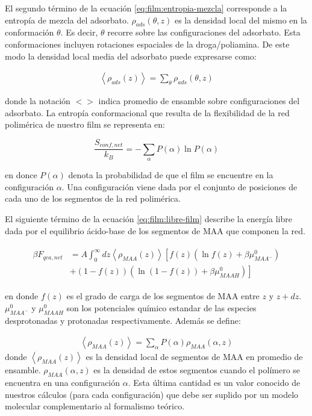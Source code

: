 El segundo t\'ermino de la ecuaci\'on \ref{eq:film:entropia-mezcla} corresponde a la entrop\'ia de mezcla del adsorbato. $\rho_{ads}(\theta,z)$ es la densidad local del mismo en la conformaci\'on $\theta$. Es decir, $\theta$ recorre sobre las configuraciones del adsorbato.
Esta conformaciones incluyen rotaciones espaciales de la droga/poliamina.
De este modo la densidad local media del adsorbato  puede expresarse como:


\begin{align}
	\left<\rho_{ads}(z)\right> = \sum_\theta{\rho_{ads}(\theta,z)}
	\label{eq:film:ads-z-theta}
\end{align}

\noindent donde la notaci\'on $<>$ indica promedio de ensamble sobre configuraciones del adsorbato.
La entrop\'ia conformacional que resulta de la flexibilidad de la red polim\'erica de nuestro film se representa en:

\begin{equation}
	\frac{S_{conf,net}}{k_B} = - \sum_{\alpha}{P(\alpha)\ln P(\alpha)}
\end{equation}

\noindent en donce $P(\alpha)$ denota la probabilidad de que el film se encuentre en la configuraci\'on $\alpha$. Una configuraci\'on viene dada por el conjunto de posiciones de cada uno de los segmentos de la red polim\'erica. 

El siguiente t\'ermino de la ecuaci\'on \ref{eq:film:libre-film} describe  la energ\'ia libre dada por  el equilibrio \'acido-base de los segmentos de MAA que componen la red. 

\begin{align}
	\begin{aligned}
		\beta F_{qca,net} &= A\int_0^\infty dz \left<\rho_{MAA}(z)\right> \left[f(z)(\ln f(z)+ \beta\mu^0_{MAA^-})\right.\\
		&\left.+(1-f(z))(\ln (1-f(z))+\beta\mu^0_{MAAH})\right]    
	\end{aligned}
\end{align} 

\noindent en donde $f(z)$ es el grado de carga de los segmentos de MAA entre  $z$ y $z + dz$. 
$\mu^0_{MAA^-}$ y $\mu^0_{MAAH}$ son los potenciales qu\'imico estandar  de las especies  desprotonadas y protonadas respectivamente.
Adem\'as se define:

\begin{align}
	\left< \rho_{MAA}(z)\right> = \sum_\alpha{P(\alpha)\rho_{MAA}(\alpha,z)}
\end{align}
\noindent donde $\left< \rho_{MAA}(z)\right>$ es la densidad local de segmentos de MAA en promedio de ensamble. $\rho_{MAA}(\alpha,z)$ es la densidad de estos segmentos cuando el pol\'imero se encuentra en una configuraci\'on $\alpha$. Esta \'ultima cantidad es un valor conocido de nuestros c\'alculos (para cada configuraci\'on) que debe ser suplido por un modelo molecular complementario al formalismo te\'orico.


